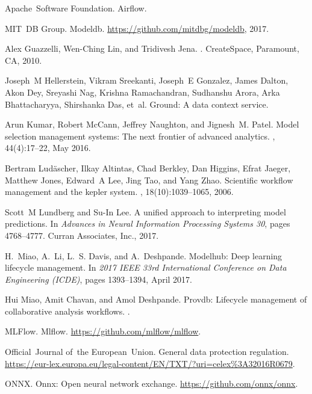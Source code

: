 \documentclass[11pt]{article}
\begin{document}
\begin{thebibliography}{10}
\begin{small}
Apache~Software Foundation.
\newblock Airflow.

MIT~DB Group.
\newblock Modeldb.
\newblock \url{https://github.com/mitdbg/modeldb}, 2017.

Alex Guazzelli, Wen-Ching Lin, and Tridivesh Jena.
.
\newblock CreateSpace, Paramount, CA, 2010.

Joseph~M Hellerstein, Vikram Sreekanti, Joseph~E Gonzalez, James Dalton, Akon
  Dey, Sreyashi Nag, Krishna Ramachandran, Sudhanshu Arora, Arka Bhattacharyya,
  Shirshanka Das, et~al.
\newblock Ground: A data context service.

Arun Kumar, Robert McCann, Jeffrey Naughton, and Jignesh~M. Patel.
\newblock Model selection management systems: The next frontier of advanced
  analytics.
, 44(4):17--22, May 2016.

Bertram Lud{\"a}scher, Ilkay Altintas, Chad Berkley, Dan Higgins, Efrat Jaeger,
  Matthew Jones, Edward~A Lee, Jing Tao, and Yang Zhao.
\newblock Scientific workflow management and the kepler system.
,
  18(10):1039--1065, 2006.

Scott~M Lundberg and Su-In Lee.
\newblock A unified approach to interpreting model predictions.
\newblock In {\em Advances in Neural Information Processing Systems 30}, pages
  4768--4777. Curran Associates, Inc., 2017.

H.~Miao, A.~Li, L.~S. Davis, and A.~Deshpande.
\newblock Modelhub: Deep learning lifecycle management.
\newblock In {\em 2017 IEEE 33rd International Conference on Data Engineering
  (ICDE)}, pages 1393--1394, April 2017.

Hui Miao, Amit Chavan, and Amol Deshpande.
\newblock Provdb: Lifecycle management of collaborative analysis workflows.
.

MLFlow.
\newblock Mlflow.
\newblock \url{https://github.com/mlflow/mlflow}.

Official~Journal of~the European~Union.
\newblock General data protection regulation.
\newblock
  \url{https://eur-lex.europa.eu/legal-content/EN/TXT/?uri=celex%3A32016R0679}.

ONNX.
\newblock Onnx: Open neural network exchange.
\newblock \url{https://github.com/onnx/onnx}.


\end{small}
\end{thebibliography}
\end{document}
